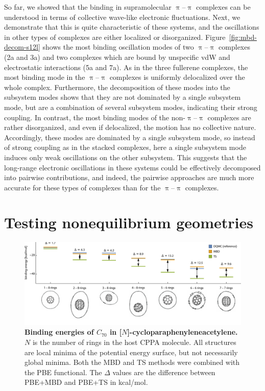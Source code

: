 So far, we showed that the binding in supramolecular $\uppi$--$\uppi$ complexes can be understood in terms of collective wave-like electronic fluctuations.
Next, we demonstrate that this is quite characteristic of these systems, and the oscillations in other types of complexes are either localized or disorganized.
Figure~\ref{fig:mbd-decom-s12l} shows the most binding oscillation modes of two $\uppi$--$\uppi$ complexes (2a and 3a) and two complexes which are bound by unspecific vdW and electrostatic interactions (5a and 7a).
As in the three fullerene complexes, the most binding mode in the $\uppi$--$\uppi$ complexes is uniformly delocalized over the whole complex.
Furthermore, the decomposition of these modes into the subsystem modes shows that they are not dominated by a single subsystem mode, but are a combination of several subsystem modes, indicating their strong coupling.
In contrast, the most binding modes of the non-$\uppi$--$\uppi$ complexes are rather disorganized, and even if delocalized, the motion has no collective nature.
Accordingly, these modes are dominated by a single subsystem mode, so instead of strong coupling as in the stacked complexes, here a single subsystem mode induces only weak oscillations on the other subsystem.
This suggests that the long-range electronic oscillations in these systems could be effectively decomposed into pairwise contributions, and indeed, the pairwise approaches are much more accurate for these types of complexes than for the $\uppi$--$\uppi$ complexes.

\section{Testing nonequilibrium geometries}

\begin{figure}
\includegraphics[width=\linewidth]{media/cppa-complexes.pdf}
\caption{\textbf{Binding energies of $C_{70}$ in [$N$]-cycloparaphenyleneacetylene.}
$N$ is the number of rings in the host CPPA molecule.
All structures are local minima of the potential energy surface, but not necessarily global minima.
Both the MBD and TS methods were combined with the PBE functional.
The $\Delta$ values are the difference between PBE+MBD and PBE+TS in kcal/mol.
}\label{fig:mbd-noneq}
\end{figure}

